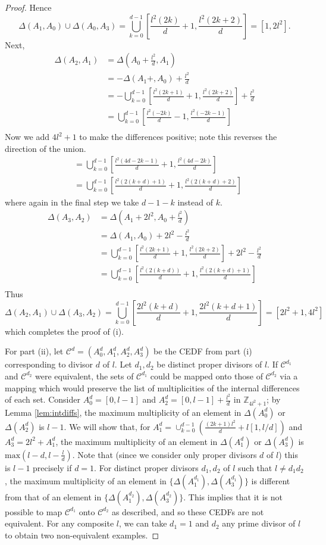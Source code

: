 \documentclass[10pt,a4paper]{amsart}
\begin{document}
\begin{proof}
Hence 
$$\Delta(A_1,A_0) \cup \Delta(A_0,A_3) =\bigcup_{k=0}^{d-1} [\frac{l^2(2k)}{d}+1, \frac{l^2(2k+2)}{d}]=[1,2l^2].$$
Next,
\begin{align*}
\Delta(A_2,A_1) &=\Delta(A_0+\frac{l^2}{d},A_1)\\
&=-\Delta(A_1+,A_0)+\frac{l^2}{d}\\
&=-\bigcup_{k=0}^{d-1} [\frac{l^2(2k+1)}{d}+1, \frac{l^2(2k+2)}{d}]+\frac{l^2}{d}\\
&=\bigcup_{k=0}^{d-1} [\frac{l^2(-2k)}{d}-1, \frac{l^2(-2k-1)}{d}]\\
\end{align*}
Now we add $4l^2+1$ to make the differences positive; note this reverses the direction of the union.
\begin{align*}
&=\bigcup_{k=0}^{d-1} [\frac{l^2(4d-2k-1)}{d}+1, \frac{l^2(4d-2k)}{d}]\\
&=\bigcup_{k=0}^{d-1} [\frac{l^2(2(k+d)+1)}{d}+1, \frac{l^2(2(k+d)+2)}{d}]
\end{align*}
where again in the final step we take $d-1-k$ instead of $k$.
\begin{align*}
\Delta(A_3,A_2) &=\Delta(A_1+2l^2,A_0+\frac{l^2}{d})\\
&=\Delta(A_1,A_0)+2l^2-\frac{l^2}{d}\\
&=\bigcup_{k=0}^{d-1} [\frac{l^2(2k+1)}{d}+1, \frac{l^2(2k+2)}{d}]+2l^2-\frac{l^2}{d}\\
&=\bigcup_{k=0}^{d-1} [\frac{l^2 (2(k+d))}{d}+1, \frac{l^2 (2(k+d)+1)}{d}]\\
\end{align*}
Thus
$$\Delta(A_2,A_1) \cup \Delta(A_3,A_2) =\bigcup_{k=0}^{d-1} [\frac{2l^2(k+d)}{d}+1, \frac{2l^2(k+d+1)}{d}]=[2l^2+1,4l^2]$$
which completes the proof of (i).


For part (ii), let $\mathcal{C}^d=(A_0^{d},A_1^{d},A_2^{d},A_3^{d})$ be the CEDF from part (i) corresponding to divisor $d$ of $l$.  Let $d_1,d_2$ be distinct proper divisors of $l$. If $\mathcal{C}^{d_1}$ and $\mathcal{C}^{d_2}$ were equivalent, the sets of $\mathcal{C}^{d_1}$ could be mapped onto those of $\mathcal{C}^{d_2}$ via a mapping which would preserve the list of multiplicities of the internal differences of each set.   Consider $A_0^d=[0,l-1]$ and $A_2^d=[0,l-1]+\frac{l^2}{d}$ in $\mathbb{Z}_{4l^2+1}$; by Lemma \ref{lem:intdiffs}, the maximum multiplicity of an element in $\Delta(A_0^d)$ or $\Delta(A_2^d)$ is $l-1$.  We will show that, for $A_1^d=\cup_{k=0}^{d-1} (\frac{(2k+1)l^2}{d} +l[1,l/d])$ and $A_3^d=2l^2+A_1^d$, the maximum multiplicity of an element in $\Delta(A_1^d)$ or $\Delta(A_3^d)$ is $\mathrm{max}(l-d,l-\frac{l}{d})$. Note that (since we consider only proper divisors $d$ of $l$) this is $l-1$ precisely if $d=1$.  For distinct proper divisors $d_1,d_2$ of $l$ such that $l\neq d_1 d_2$, the maximum multiplicity of an element in $\{\Delta(A_1^{d_1}), \Delta(A_3^{d_1})\}$ is different from that of an element in  $\{\Delta(A_1^{d_2}), \Delta(A_3^{d_2})\}$.   This implies that it is not possible to map $\mathcal{C}^{d_1}$ onto $\mathcal{C}^{d_2}$ as described, and so these CEDFs are not equivalent. For any composite $l$, we can take $d_1=1$ and $d_2$ any prime divisor of $l$ to obtain two non-equivalent examples.


\end{proof}
\end{document}
